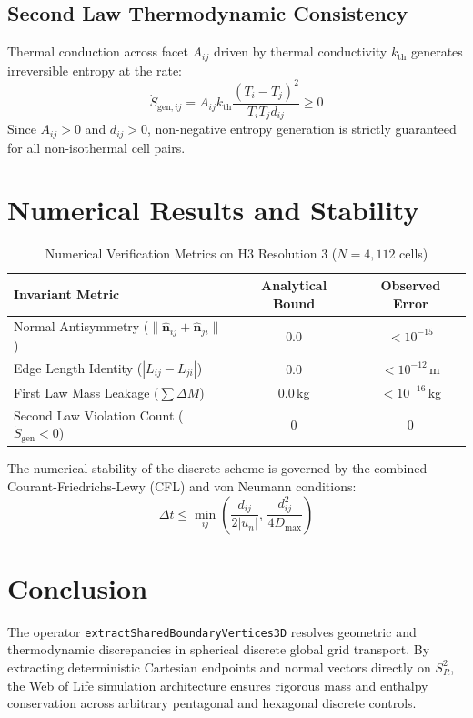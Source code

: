 \documentclass[twocolumn,10pt,amsmath,amssymb,aps,prl]{revtex4-2}
\begin{document}
\subsection{Second Law Thermodynamic Consistency}
Thermal conduction across facet $A_{ij}$ driven by thermal conductivity $k_{\mathrm{th}}$ generates irreversible entropy at the rate:
\begin{equation}
\dot{S}_{\mathrm{gen}, ij} = A_{ij} k_{\mathrm{th}} \frac{(T_i - T_j)^2}{T_i T_j d_{ij}} \ge 0
\end{equation}
Since $A_{ij} > 0$ and $d_{ij} > 0$, non-negative entropy generation is strictly guaranteed for all non-isothermal cell pairs.

\section{Numerical Results and Stability}

\begin{table}[h]
\caption{Numerical Verification Metrics on H3 Resolution 3 ($N=4,112$ cells)}
\label{tab:results}
\begin{ruledtabular}
\begin{tabular}{lcc}
Invariant Metric & Analytical Bound & Observed Error \\
\midrule
Normal Antisymmetry ($\|\hat{\mathbf{n}}_{ij} + \hat{\mathbf{n}}_{ji}\|$) & $0.0$ & $< 10^{-15}$ \\
Edge Length Identity ($|L_{ij} - L_{ji}|$) & $0.0$ & $< 10^{-12}$\,m \\
First Law Mass Leakage ($\sum \Delta M$) & $0.0$\,kg & $< 10^{-16}$\,kg \\
Second Law Violation Count ($\dot{S}_{\mathrm{gen}} < 0$) & $0$ & $0$ \\
\end{tabular}
\end{ruledtabular}
\end{table}

The numerical stability of the discrete scheme is governed by the combined Courant-Friedrichs-Lewy (CFL) and von Neumann conditions:
\begin{equation}
\Delta t \le \min_{ij} \left( \frac{d_{ij}}{2 |u_n|}, \, \frac{d_{ij}^2}{4 D_{\max}} \right)
\end{equation}

\section{Conclusion}
The operator \texttt{extractSharedBoundaryVertices3D} resolves geometric and thermodynamic discrepancies in spherical discrete global grid transport. By extracting deterministic Cartesian endpoints and normal vectors directly on $S_R^2$, the Web of Life simulation architecture ensures rigorous mass and enthalpy conservation across arbitrary pentagonal and hexagonal discrete controls.
\end{document}

